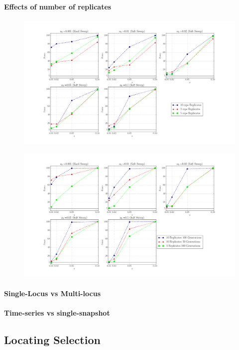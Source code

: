 \documentclass[11pt]{article}
\begin{document}
\paragraph{Effects of number of replicates}
\begin{figure}
	\centering
\includegraphics[trim=2.2in 0 2.2in 0, clip,width=\textwidth]{powerReplicate}
\end{figure}
\begin{figure}
	\centering
\includegraphics[trim=2.2in 0 2.2in 0, 
clip,width=\textwidth]{powerReplicateTime}
\end{figure}
\paragraph{Single-Locus vs Multi-locus}
\paragraph{Time-series vs single-snapshot}

\subsection{Locating Selection}
\end{document}
